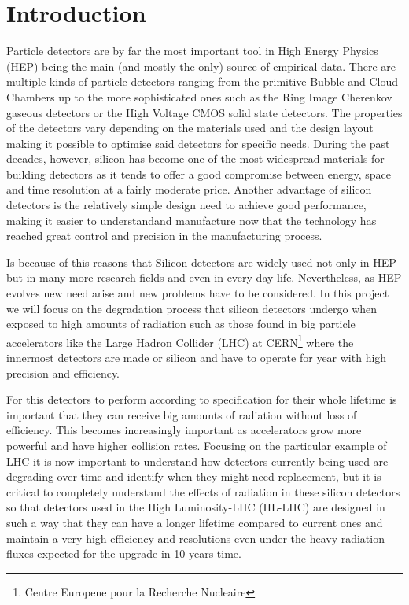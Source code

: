 \chapter{Introduction}

Particle detectors are by far the most important tool in High Energy Physics (HEP) being the main (and mostly the only) source of empirical data. There are multiple kinds of particle detectors ranging from the primitive Bubble and Cloud Chambers up to the more sophisticated ones such as the Ring Image Cherenkov gaseous detectors or the High Voltage CMOS solid state detectors. The properties of the detectors vary depending on the materials used and the design layout making it possible to optimise said detectors for specific needs. During the past decades, however, silicon has become one of the most widespread materials for building detectors as it tends to offer a good compromise between energy, space and time resolution at a fairly moderate price. Another advantage of silicon detectors is the relatively simple design need to achieve good performance, making it easier to understandand manufacture now that the technology has reached great control and precision in the manufacturing process.

Is because of this reasons that Silicon detectors are widely used not only in HEP but in many more research fields and even in every-day life. Nevertheless, as HEP evolves new need arise and new problems have to be considered. In this project we will focus on the degradation process that silicon detectors undergo when exposed to high amounts of radiation such as those found in big particle accelerators like the Large Hadron Collider (LHC) at CERN\footnote{Centre Europene pour la Recherche Nucleaire} where the innermost detectors are made or silicon and have to operate for year with high precision and efficiency. 

For this detectors to perform according to specification for their whole lifetime is important that they can receive big amounts of radiation without loss of efficiency. This becomes increasingly important as accelerators grow more powerful and have higher collision rates. Focusing on the particular example of LHC it is now important to understand how detectors currently being used are degrading over time and identify when they might need replacement, but it is critical to completely understand the effects of radiation in these silicon detectors so that detectors used in the High Luminosity-LHC (HL-LHC) are designed in such a way that they can have a longer lifetime compared to current ones and maintain a very high efficiency and resolutions even under the heavy radiation fluxes expected for the upgrade in 10 years time.

